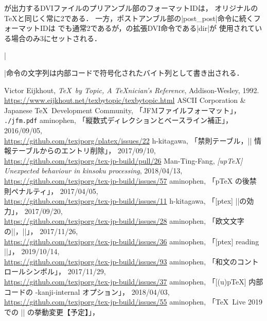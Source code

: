 \documentclass[a4paper,11pt,nomag,dvipdfmx]{jsarticle}
\begin{document}
\pTeX が出力するDVIファイルのプリアンブル部のフォーマットIDは，
オリジナルの\TeX と同じく常に2である．
一方，ポストアンブル部の|post_post|命令に続くフォーマットIDは
\pTeX でも通常2であるが，\pTeX の拡張DVI命令である|dir|が
使用されている場合のみ3にセットされる．

|\special|命令の文字列は内部コードで符号化されたバイト列として書き出される．

\begin{thebibliography}{99}
  Victor Eijkhout, \textit{\TeX\ by Topic, A \TeX nician's Reference},
  Addison-Wesley, 1992.\\
  \url{https://www.eijkhout.net/texbytopic/texbytopic.html}
  ASCII Corporation \& Japanese \TeX\ Development Community, 「JFMファイルフォーマット」，
  \texttt{./jfm.pdf}
  aminophen, 「縦数式ディレクションとベースライン補正」，
  2016/09/05,\\
  \url{https://github.com/texjporg/platex/issues/22}
  h-kitagawa, 「禁則テーブル，|\inhibitxspcode| 情報テーブルからのエントリ削除」，
  2017/09/10,\\
  \url{https://github.com/texjporg/tex-jp-build/pull/26}
  Man-Ting-Fang, \textit{[upTeX] Unexpected behaviour in kinsoku processing},
  2018/04/13,\\
  \url{https://github.com/texjporg/tex-jp-build/issues/57}
  aminophen, 「pTeX の後禁則ペナルティ」，
  2017/04/05,\\
  \url{https://github.com/texjporg/tex-jp-build/issues/11}
  h-kitagawa, 「[ptex] |\inhibitglue|の効力」，
  2017/09/20,\\
  \url{https://github.com/texjporg/tex-jp-build/issues/28}
  aminophen, 「欧文文字の|\kansujichar|，|\inhibitxspcode|」，
  2017/11/26,\\
  \url{https://github.com/texjporg/tex-jp-build/issues/36}
  aminophen, 「[ptex] reading |\kansujichar|」，
  2019/10/14,\\
  \url{https://github.com/texjporg/tex-jp-build/issues/93}
  aminophen, 「和文のコントロールシンボル」，
  2017/11/29,\\
  \url{https://github.com/texjporg/tex-jp-build/issues/37}
  aminophen, 「[(u)pTeX] 内部コードの -kanji-internal オプション」，
  2018/04/03,\\
  \url{https://github.com/texjporg/tex-jp-build/issues/55}
  aminophen, 「\TeX~Live 2019 での |\inhibitglue| の挙動変更【予定】」，

\end{thebibliography}
\end{document}
